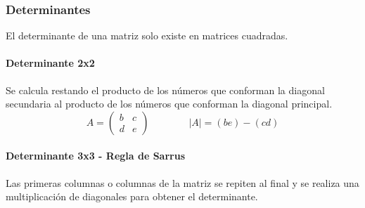 \documentclass[stu, 12pt, letterpaper, donotrepeattitle, floatsintext, natbib]{apa7}
\begin{document}
\subsubsection{Determinantes}
El determinante de una matriz solo existe en matrices cuadradas.
\paragraph{Determinante 2x2}
Se calcula restando el producto de los números que conforman la diagonal secundaria al producto de los números que conforman la diagonal principal. 
\[
A=\begin{pmatrix}
b & c \\ d & e
\end{pmatrix}
\qquad
\qquad
|A|= (be) - (cd)
\]
\paragraph{Determinante 3x3 - Regla de Sarrus}
Las primeras columnas o columnas de la matriz se repiten al final y se realiza una multiplicación de diagonales para obtener el determinante.\\
\end{document}
